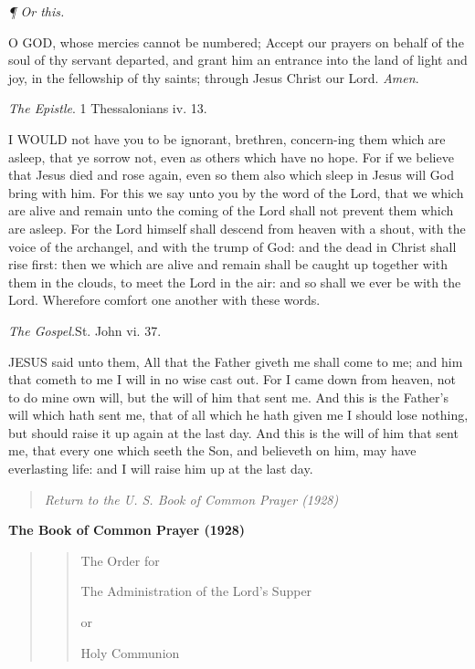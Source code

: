 \emph{¶ Or this.}

O GOD, whose mercies cannot
be numbered; Accept our prayers on behalf of the soul of thy servant departed,
and grant him an entrance into the land of light and joy, in the fellowship
of thy saints; through Jesus Christ our Lord. \emph{Amen}.

\emph{The Epistle}. 1 Thessalonians iv. 13.

I WOULD not have you to
be ignorant, brethren, concern-ing them which are asleep, that ye sorrow
not, even as others which have no hope. For if we believe that Jesus died
and rose again, even so them also which sleep in Jesus will God bring
with him. For this we say unto you by the word of the Lord, that we which
are alive and remain unto the coming of the Lord shall not prevent them
which are asleep. For the Lord himself shall descend from heaven with
a shout, with the voice of the archangel, and with the trump of God: and
the dead in Christ shall rise first: then we which are alive and remain
shall be caught up together with them in the clouds, to meet the Lord
in the air: and so shall we ever be with the Lord. Wherefore comfort one
another with these words.

\emph{The Gospel.}St. John vi. 37.

JESUS said unto them, All
that the Father giveth me shall come to me; and him that cometh to me
I will in no wise cast out. For I came down from heaven, not to do mine
own will, but the will of him that sent me. And this is the Father’s
will which hath sent me, that of all which he hath given me I should lose
nothing, but should raise it up again at the last day. And this is the
will of him that sent me, that every one which seeth the Son, and believeth
on him, may have everlasting life: and I will raise him up at the last
day.

\begin{quote}

\emph{Return to the U.
S. Book of Common Prayer (1928)}

\end{quote}


\textbf{The Book of Common Prayer (1928)}

\begin{quote}

\begin{quote}

The Order for

The
Administration of the Lord's Supper

or

Holy
Communion

\end{quote}

\end{quote}

